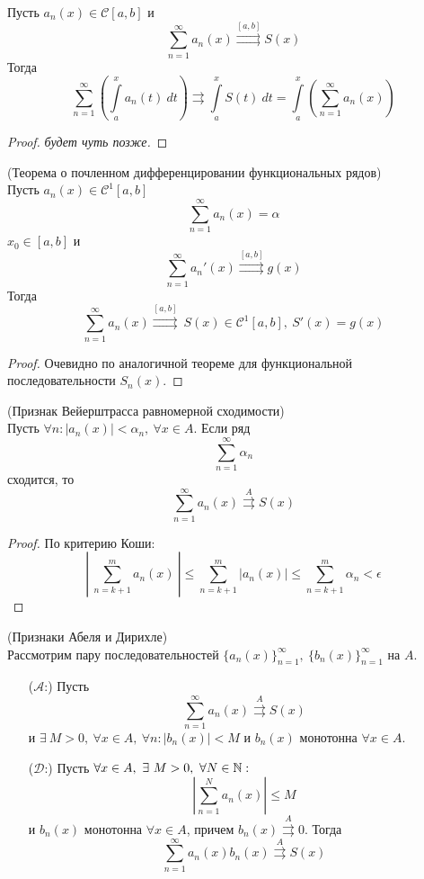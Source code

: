 \begin{theorem}
    Пусть $a_n(x)\in \mathcal{C}[a,b]$ и
    \[\sum_{n=1}^{\infty}a_n(x)\overset{[a,b]}{\rightrightarrows} S(x)\]
    Тогда 
    \[\sum_{n=1}^{\infty}\left(\int\limits_{a}^{x}a_n(t)\ dt\right)\rightrightarrows \int\limits_{a}^{x}S(t)\ dt=\int\limits_{a}^{x}\left(\sum_{n=1}^{\infty}a_n(x)\right)\]
\end{theorem}
\begin{proof}
    \textit{будет чуть позже.}
\end{proof}
\begin{theorem} (Теорема о почленном дифференцировании функциональных рядов)\\
    Пусть $a_n(x)\in \mathcal{C}^1{[a,b]}$
    \[\sum_{n=1}^{\infty}a_n(x)=\alpha\]
    $x_0\in [a,b]$ и 
    \[\sum_{n=1}^{\infty}a_n'(x)\overset{[a,b]}\rightrightarrows g(x)\]
    Тогда
    \[\sum_{n=1}^{\infty}a_n(x)\overset{[a,b]}{\rightrightarrows}\ S(x)\in \mathcal{C}^1[a,b],\ S'(x)=g(x)\]
\end{theorem}
\begin{proof}
    Очевидно по аналогичной теореме для функциональной последовательности $S_n(x)$.
\end{proof}
\begin{theorem} (Признак Вейерштрасса равномерной сходимости)\\
    Пусть $\forall n: |a_n(x)|<\alpha_n,\ \forall x\in A$. Если ряд
    \[\sum_{n=1}^{\infty}\alpha_n\]
    сходится, то
    \[\sum_{n=1}^{\infty}a_n(x)\overset{A}\rightrightarrows S(x)\]
\end{theorem}
\begin{proof} По критерию Коши:
    \[\left|\ \sum_{n=k+1}^{m}a_n(x)\ \right|\leq \sum_{n=k+1}^{m}|a_n(x)|\leq \sum_{n=k+1}^{m}\alpha_n<\epsilon\]
\end{proof}
\begin{theorem} (Признаки Абеля и Дирихле)\\
    Рассмотрим пару последовательностей $\{a_n(x)\}_{n=1}^{\infty},\ \{b_n(x)\}_{n=1}^{\infty}$ на $A$.
    \begin{itemize}
        \item[($\mathcal{A}$:)] Пусть 
        \[\sum_{n=1}^{\infty}a_n(x)\overset{A}\rightrightarrows S(x)\]
        и $\exists\ M>0,\ \forall x\in A,\ \forall n: |b_n(x)|<M$ и $b_n(x)$ монотонна $\forall x\in A$.
        \item[($\mathcal{D}$:)] Пусть $\forall x\in A,\ \exists\ M>0,\ \forall N\in \N:$ 
        \[\left|\sum_{n=1}^{N}a_n(x)\right|\leq M\]
        и $b_n(x)$ монотонна $\forall x\in A$, причем $b_n(x)\overset{A}\rightrightarrows 0$. Тогда 
        \[\sum_{n=1}^{\infty}a_n(x)b_n(x) \overset{A}\rightrightarrows S(x)\]
    \end{itemize}
\end{theorem}
